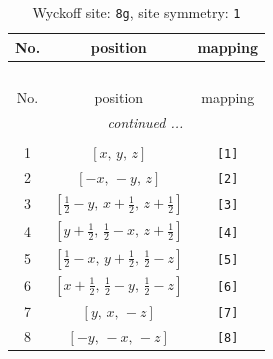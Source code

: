 \documentclass[fleqn,8pt]{jsarticle}
\begin{document}
\renewcommand{\arraystretch}{1.2}
\begin{longtable}{ccc}
\caption{Wyckoff site: {\tt 8g}, site symmetry: {\tt 1}}
 \\
 \hline \hline
No. & position & mapping \\ \hline \endfirsthead

\multicolumn{2}{l}{\tablename\ \thetable{}} \\
 \hline \hline
No. & position & mapping \\ \hline \endhead

 \hline \hline
\multicolumn{2}{r}{\footnotesize\it continued ...} \\ \endfoot

 \hline \hline
\multicolumn{2}{r}{} \\ \endlastfoot

1 & $\left[ x,\, y,\, z \right]$ & {\tt [1]} \\ \hline
2 & $\left[ - x,\, - y,\, z \right]$ & {\tt [2]} \\ \hline
3 & $\left[ \frac{1}{2} - y,\, x + \frac{1}{2},\, z + \frac{1}{2} \right]$ & {\tt [3]} \\ \hline
4 & $\left[ y + \frac{1}{2},\, \frac{1}{2} - x,\, z + \frac{1}{2} \right]$ & {\tt [4]} \\ \hline
5 & $\left[ \frac{1}{2} - x,\, y + \frac{1}{2},\, \frac{1}{2} - z \right]$ & {\tt [5]} \\ \hline
6 & $\left[ x + \frac{1}{2},\, \frac{1}{2} - y,\, \frac{1}{2} - z \right]$ & {\tt [6]} \\ \hline
7 & $\left[ y,\, x,\, - z \right]$ & {\tt [7]} \\ \hline
8 & $\left[ - y,\, - x,\, - z \right]$ & {\tt [8]} \\
\end{longtable}
\end{document}
